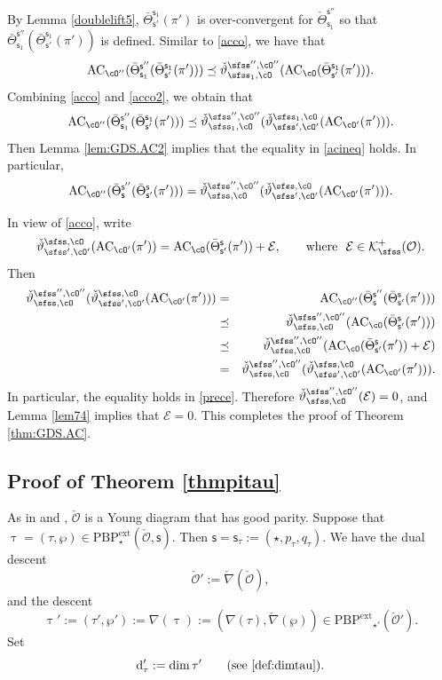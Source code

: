 \documentclass[11pt,a4paper]{amsart}
\newcommand{\CE}{{\mathcal {E}}}
\newcommand{\CK}{{\mathcal {K}}}
\newcommand{\CO}{{\mathcal {O}}}
\def\DD{\nabla}
\newcommand{\be}{\begin {equation}}
\newcommand{\ee}{\end {equation}}
\numberwithin{equation}{section}
\theoremstyle{remark}
\def\Thetab{\bar{\Theta}}
\def\PBPe{\mathrm{PBP}^{\mathrm{ext}}}
\def\ckDD{{\check\DD}}
\begin{document}
By Lemma \ref{doublelift5},  $ \Thetab_{\mathsf s'}^{\mathsf s_1}(\pi')$ is over-convergent for $ \check \Theta_{\mathsf s_1}^{\mathsf s''}$ so that $\Thetab_{\mathsf s_1}^{\mathsf s''}( \Thetab_{\mathsf s'}^{\mathsf s_1}(\pi'))$ is defined.  Similar to \eqref{acco}, we have that
   \be\label{acco2}
   \mathrm{AC}_{\cO''}( \Thetab_{\mathsf s_1}^{\mathsf s''}(\Thetab_{\mathsf s'}^{\mathsf s_1}(\pi')))\preceq   \check \vartheta_{\sfss_1, \cO}^{\sfss'', \cO''}(\mathrm{AC}_{\cO}( \Thetab_{\mathsf s'}^{\mathsf s_1}(\pi'))).
  \ee
Combining \eqref{acco} and \eqref{acco2}, we obtain that
\be\label{acineq}
   \mathrm{AC}_{\cO''}( \Thetab_{\mathsf s_1}^{\mathsf s''}(\Thetab_{\mathsf s'}^{\mathsf s_1}(\pi')))\preceq   \check \vartheta_{\sfss_1, \cO}^{\sfss'', \cO''}(\check \vartheta_{\sfss', \cO'}^{\sfss_1, \cO}(\mathrm{AC}_{\cO'}(\pi'))).
\ee
Then Lemma \ref{lem:GDS.AC2} implies that the equality in \eqref{acineq} holds. In particular,
\be\label{acineq2}
   \mathrm{AC}_{\cO''}( \Thetab_{\mathsf s}^{\mathsf s''}(\Thetab_{\mathsf s'}^{\mathsf s}(\pi')))=  \check \vartheta_{\sfss, \cO}^{\sfss'', \cO''}(\check \vartheta_{\sfss', \cO'}^{\sfss, \cO}(\mathrm{AC}_{\cO'}(\pi'))).
\ee

In view of \eqref{acco}, write
\[
  \check \vartheta_{\sfss', \cO'}^{\sfss, \cO}(\mathrm{AC}_{\cO'}(\pi'))=\mathrm{AC}_{\cO}( \Thetab_{\mathsf s'}^{\mathsf s}(\pi'))+\CE,\qquad\textrm{where $\ \CE\in \CK^+_\sfss(\CO)$}.
\]
Then
\begin{eqnarray}
\nonumber \check \vartheta_{\sfss, \cO}^{\sfss'', \cO''}(\check \vartheta_{\sfss', \cO'}^{\sfss, \cO}(\mathrm{AC}_{\cO'}(\pi')))
\nonumber &=&\mathrm{AC}_{\cO''}( \Thetab_{\mathsf s}^{\mathsf s''}(\Thetab_{\mathsf s'}^{\mathsf s}(\pi')))\\
\nonumber &\preceq &  \check \vartheta_{\sfss, \cO}^{\sfss'', \cO''}(\mathrm{AC}_{\cO}( \Thetab_{\mathsf s'}^{\mathsf s}(\pi')))\\
\label{prece}  &\preceq &  \check \vartheta_{\sfss, \cO}^{\sfss'', \cO''}(\mathrm{AC}_{\cO}( \Thetab_{\mathsf s'}^{\mathsf s}(\pi'))+\CE)\\
\nonumber &=&\check \vartheta_{\sfss, \cO}^{\sfss'', \cO''}(\check \vartheta_{\sfss', \cO'}^{\sfss, \cO}(\mathrm{AC}_{\cO'}(\pi'))).
\end{eqnarray}
In particular,  the equality holds in \eqref{prece}. Therefore  $\check \vartheta_{\sfss, \cO}^{\sfss'', \cO''}(\CE)=0$, and
Lemma \ref{lem74} implies that $\CE=0$. This completes the proof of Theorem \ref{thm:GDS.AC}.


 \subsection{Proof of Theorem \ref{thmpitau} }\label{sec:comANDgeo}
  As in  and ,
  $\check \CO$ is a Young diagram that has good parity. Suppose that
$\uptau=(\tau, \wp)\in \PBPe_\star(\check \CO,\mathsf s)$. Then $\mathsf s =\mathsf s_{\tau}:=(\star, p_\tau, q_\tau)$. We have the dual descent
\[
  \check \CO':=\check \nabla(\check \CO),
\]
and the descent
 \[
  \uptau' := (\tau',\wp'):=\nabla(\uptau):= (\DD(\tau), \ckDD(\wp))\in \mathrm{\PBPe}_{\star'}(\check \CO').
 \]
 Set
 \[
  \mathrm d'_\tau:=
    \dim \tau' \qquad (\text{see \eqref{def:dimtau}}).
    \]
\end{document}
